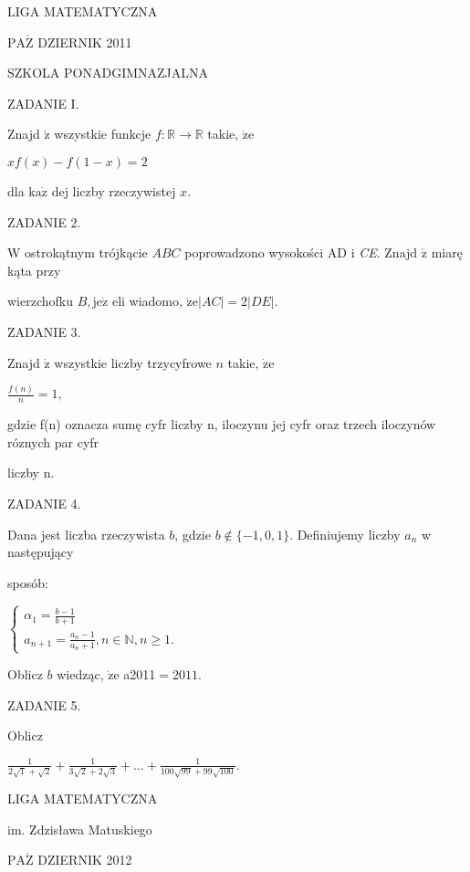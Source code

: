 \documentclass[a4paper,12pt]{article}
\begin{document}
LIGA MATEMATYCZNA

$\mathrm{P}\mathrm{A}\acute{\mathrm{Z}}$ DZIERNIK 2011

SZKOLA PONADGIMNAZJALNA

ZADANIE I.

Znajd $\acute{\mathrm{z}}$ wszystkie funkcje $f:\mathbb{R}\rightarrow \mathbb{R}$ takie, $\dot{\mathrm{z}}\mathrm{e}$

$xf(x)-f(1-x)=2$

dla $\mathrm{k}\mathrm{a}\dot{\mathrm{z}}$ dej liczby rzeczywistej $x.$

ZADANIE 2.

$\mathrm{W}$ ostrokątnym trójkącie $ABC$ poprowadzono wysokości AD $\mathrm{i}$ {\it CE}. Znajd $\acute{\mathrm{z}}$ miarę kąta przy

wierzchofku $B, \mathrm{j}\mathrm{e}\dot{\mathrm{z}}$ eli wiadomo, $\dot{\mathrm{z}}\mathrm{e}|AC|=2|DE|.$

ZADANIE 3.

Znajd $\acute{\mathrm{z}}$ wszystkie liczby trzycyfrowe $n$ takie, $\dot{\mathrm{z}}\mathrm{e}$

$\displaystyle \frac{f(n)}{n}=1,$

gdzie f(n) oznacza sumę cyfr liczby n, iloczynu jej cyfr oraz trzech iloczynów róznych par cyfr

liczby n.

ZADANIE 4.

Dana jest liczba rzeczywista $b$, gdzie $b \not\in \{-1,0,1\}$. Definiujemy liczby $a_{n}$ w następujący

sposób:

$\left\{\begin{array}{l}
\alpha_{1}=\frac{b-1}{b+1}\\
a_{n+1}=\frac{a_{n}-1}{a_{n}+1},n\in \mathbb{N},n\geq 1.
\end{array}\right.$

Oblicz $b$ wiedząc, $\dot{\mathrm{z}}\mathrm{e}$ a2011$=2011.$

ZADANIE 5.

Oblicz

$\displaystyle \frac{1}{2\sqrt{1}+\sqrt{2}}+\frac{1}{3\sqrt{2}+2\sqrt{3}}+\ldots+\frac{1}{100\sqrt{99}+99\sqrt{100}}.$






LIGA MATEMATYCZNA

im. Zdzisława Matuskiego

$\mathrm{P}\mathrm{A}\acute{\mathrm{Z}}$ DZIERNIK 2012
\end{document}
